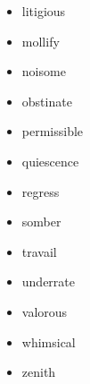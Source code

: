 \begin{itemize}
\item litigious \underline{\hspace{2in}}

\item mollify \underline{\hspace{2in}}

\item noisome \underline{\hspace{2in}}

\item obstinate \underline{\hspace{2in}}

\item permissible  \underline{\hspace{2in}}

\item quiescence  \underline{\hspace{2in}}

\item regress  \underline{\hspace{2in}}

\item somber  \underline{\hspace{2in}}

\item travail  \underline{\hspace{2in}}

\item underrate  \underline{\hspace{2in}}

\item valorous  \underline{\hspace{2in}}

\item whimsical  \underline{\hspace{2in}}

\item zenith  \underline{\hspace{2in}}

\end{itemize} 





